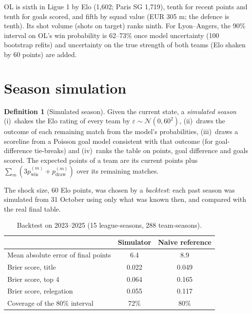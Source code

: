 \documentclass[11pt,a4paper]{article}
\theoremstyle{definition}
\newtheorem{definition}{Definition}[section]
\theoremstyle{remark}
\begin{document}
OL is sixth in Ligue 1 by Elo (1{,}602; Paris SG 1{,}719), tenth for recent points and tenth for goals scored,
and fifth by squad value (EUR 305 m; the defence is tenth). Its shot volume (shots on target) ranks ninth.
For Lyon--Angers, the 90\% interval on OL's win probability is 62--73\% once model uncertainty (100 bootstrap refits) and uncertainty on the true strength of both teams (Elo shaken by 60 points) are added.

\section{Season simulation}

\begin{definition}[Simulated season]
Given the current state, a \emph{simulated season} (i)~shakes the Elo rating of every team by $\varepsilon\sim\mathcal{N}(0,60^2)$, (ii)~draws the outcome of each remaining match from the model's probabilities,
(iii)~draws a scoreline from a Poisson goal model consistent with that outcome (for goal-difference tie-breaks) and (iv)~ranks the table on points, goal difference and goals scored.
The expected points of a team are its current points plus $\sum_{m}(3p^{(m)}_{\mathrm{win}}+p^{(m)}_{\mathrm{draw}})$ over its remaining matches.
\end{definition}

The shock size, 60 Elo points, was chosen by a \emph{backtest}: each past season was simulated from 31 October using only what was known then, and compared with the real final table.

\begin{table}[H]
\caption{Backtest on 2023--2025 (15 league-seasons, 288 team-seasons).}
\begin{center}
\small
\begin{tabular}{lcc}
\toprule
\textbf{} & \textbf{Simulator} & \textbf{Naive reference} \\
\midrule
Mean absolute error of final points & 6.4 & 8.9 \\
Brier score, title & 0.022 & 0.049 \\
Brier score, top 4 & 0.064 & 0.165 \\
Brier score, relegation & 0.055 & 0.117 \\
Coverage of the 80\% interval & 72\% & 80\% \\
\bottomrule
\end{tabular}
\end{center}
\end{table}
\end{document}
